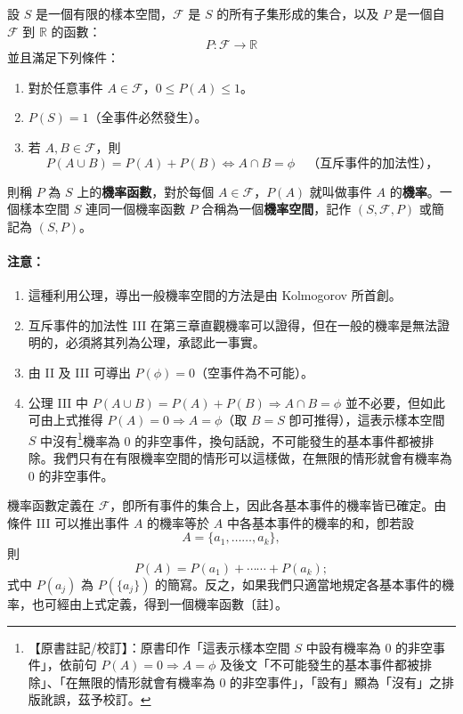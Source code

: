 \medskip
\begin{definition*}
設 $S$ 是一個有限的樣本空間，$\mathscr{F}$ 是 $S$ 的所有子集形成的集合，以及 $P$ 是一個自 $\mathscr{F}$ 到 $\mathbb{R}$ 的函數：
\[
P \colon \mathscr{F} \longrightarrow \mathbb{R}
\]
並且滿足下列條件：
\begin{enumerate}[label=\Roman*., itemsep=2pt, topsep=2pt]
  \item 對於任意事件 $A \in \mathscr{F}$，$0 \le P(A) \le 1$。
  \item $P(S) = 1$（全事件必然發生）。
  \item 若 $A, B \in \mathscr{F}$，則
  \[
  P(A \cup B) = P(A) + P(B) \Longleftrightarrow A \cap B = \phi \quad \text{（互斥事件的加法性），}
  \]
\end{enumerate}
則稱 $P$ 為 $S$ 上的\textbf{機率函數}，對於每個 $A \in \mathscr{F}$，$P(A)$ 就叫做事件 $A$ 的\textbf{機率}。一個樣本空間 $S$ 連同一個機率函數 $P$ 合稱為一個\textbf{機率空間}，記作 $(S, \mathscr{F}, P)$ 或簡記為 $(S, P)$。
\end{definition*}

\medskip
\paragraph{注意：}
\begin{enumerate}[label=\arabic*., leftmargin=2em, itemsep=0.3em]
  \item 這種利用公理，導出一般機率空間的方法是由 Kolmogorov 所首創。
  \item 互斥事件的加法性 III 在第三章直觀機率可以證得，但在一般的機率是無法證明的，必須將其列為公理，承認此一事實。
  \item 由 II 及 III 可導出 $P(\phi) = 0$（空事件為不可能）。
  \item 公理 III 中 $P(A \cup B) = P(A) + P(B) \Longrightarrow A \cap B = \phi$ 並不必要，但如此可由上式推得 $P(A) = 0 \Longrightarrow A = \phi$（取 $B = S$ 卽可推得），這表示樣本空間 $S$ 中沒有\label{note:b5-ch4-p116-meiyou}\footnote{【原書註記/校訂】：原書印作「這表示樣本空間 $S$ 中設有機率為 0 的非空事件」，依前句 $P(A) = 0 \Longrightarrow A = \phi$ 及後文「不可能發生的基本事件都被排除」、「在無限的情形就會有機率為 0 的非空事件」，「設有」顯為「沒有」之排版訛誤，茲予校訂。}機率為 0 的非空事件，換句話說，不可能發生的基本事件都被排除。我們只有在有限機率空間的情形可以這樣做，在無限的情形就會有機率為 0 的非空事件。
\end{enumerate}

機率函數定義在 $\mathscr{F}$，卽所有事件的集合上，因此各基本事件的機率皆已確定。由條件 III 可以推出事件 $A$ 的機率等於 $A$ 中各基本事件的機率的和，卽若設
\[
A = \{a_1, \dots\dots, a_k\},
\]
則
\[
P(A) = P(a_1) + \cdots\cdots + P(a_k);
\]
式中 $P(a_j)$ 為 $P(\{a_j\})$ 的簡寫。反之，如果我們只適當地規定各基本事件的機率，也可經由上式定義，得到一個機率函數〔註〕。

